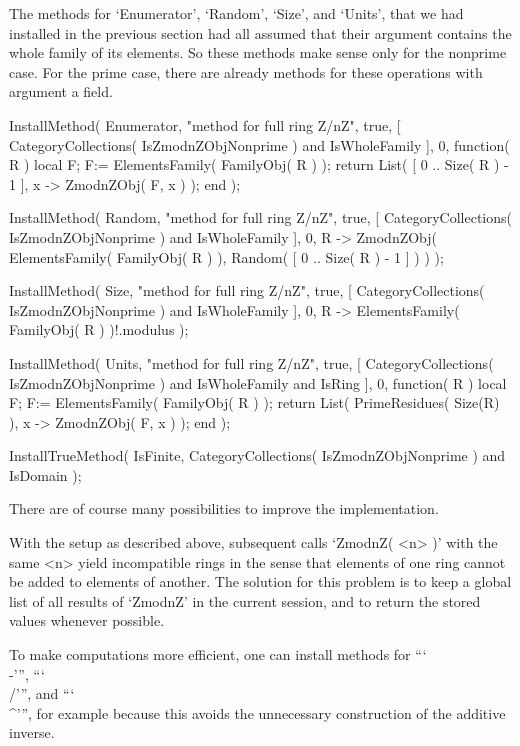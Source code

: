 The methods for `Enumerator', `Random', `Size', and `Units',
that we had installed in the previous section had all assumed that
their argument contains the whole family of its elements.
So these methods make sense only for the nonprime case.
For the prime case, there are already methods for these operations
with argument a field.

\begintt
    InstallMethod( Enumerator,
        "method for full ring Z/nZ",
        true,
        [ CategoryCollections( IsZmodnZObjNonprime ) and IsWholeFamily ],
        0,
        function( R )
        local F;
        F:= ElementsFamily( FamilyObj( R ) );
        return List( [ 0 .. Size( R ) - 1 ], x -> ZmodnZObj( F, x ) );
        end );

    InstallMethod( Random,
        "method for full ring Z/nZ",
        true,
        [ CategoryCollections( IsZmodnZObjNonprime ) and IsWholeFamily ],
        0,
        R -> ZmodnZObj( ElementsFamily( FamilyObj( R ) ),
                        Random( [ 0 .. Size( R ) - 1 ] ) ) );

    InstallMethod( Size,
        "method for full ring Z/nZ",
        true,
        [ CategoryCollections( IsZmodnZObjNonprime ) and IsWholeFamily ],
        0,
        R -> ElementsFamily( FamilyObj( R ) )!.modulus );

    InstallMethod( Units,
        "method for full ring Z/nZ",
        true,
        [     CategoryCollections( IsZmodnZObjNonprime )
          and IsWholeFamily and IsRing ],
        0,
        function( R )
        local F;
        F:= ElementsFamily( FamilyObj( R ) );
        return List( PrimeResidues( Size(R) ), x -> ZmodnZObj( F, x ) );
        end );

    InstallTrueMethod( IsFinite,
        CategoryCollections( IsZmodnZObjNonprime ) and IsDomain );
\endtt



There are of course many possibilities to improve the implementation.

With the setup as described above,
subsequent calls `ZmodnZ( <n> )' with the same <n> yield incompatible
rings in the sense that elements of one ring cannot be added to elements
of another.
The solution for this problem is to keep a global list of all results of
`ZmodnZ' in the current {\GAP} session, and to return the stored values
whenever possible.

To make computations more efficient,
one can install methods for ```\\-''', ```\\/''', and ```\\^''',
for example because this avoids the unnecessary construction of the
additive inverse.

